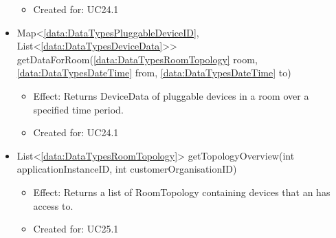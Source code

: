 \begin{description}
\begin{itemize}[noitemsep,nolistsep,leftmargin=-.25cm]
\begin{itemize}[noitemsep,nolistsep]
\item Created for: UC24.1
        \end{itemize}
      \item \textsf{Map\textless{}\ref{data:DataTypesPluggableDeviceID}, List\textless{}\ref{data:DataTypesDeviceData}\textgreater{}\textgreater{} getDataForRoom(\ref{data:DataTypesRoomTopology} room, \ref{data:DataTypesDateTime} from, \ref{data:DataTypesDateTime} to)}
        \begin{itemize}[noitemsep,nolistsep]
           \item Effect: Returns DeviceData of pluggable devices in a room over a specified time period.
\item Created for: UC24.1
        \end{itemize}
      \item \textsf{List\textless{}\ref{data:DataTypesRoomTopology}\textgreater{} getTopologyOverview(int applicationInstanceID, int customerOrganisationID)}
        \begin{itemize}[noitemsep,nolistsep]
           \item Effect: Returns a list of RoomTopology containing devices that an  has access to.
\item Created for: UC25.1
        \end{itemize}
    \end{itemize}
    \end{description}

